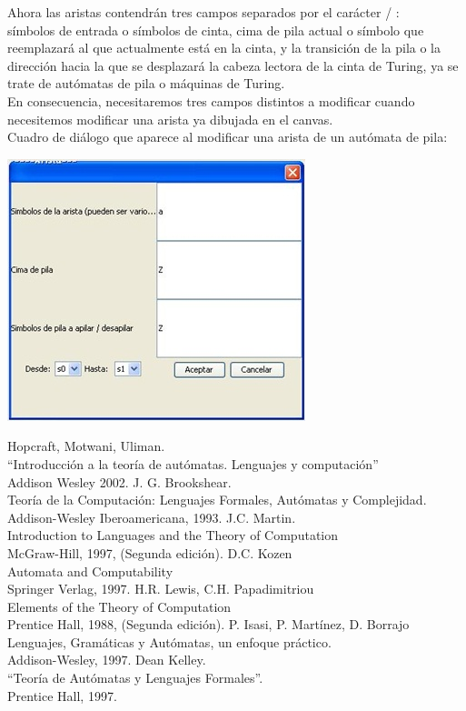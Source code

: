 \documentclass[12pt,a4paper,spanish]{book}
\begin{document}
\begin{itemize}
Ahora las aristas contendr\'an tres campos separados por el car\'acter / :\\
s\'imbolos de entrada o s\'imbolos de cinta, cima de pila actual o s\'imbolo que reemplazar\'a al que actualmente est\'a en la cinta, y la transici\'on de la pila o la direcci\'on hacia la que se desplazar\'a la cabeza lectora de la cinta de Turing, ya se trate de aut\'omatas de pila o m\'aquinas de Turing.\\ En consecuencia, necesitaremos tres campos distintos a modificar cuando necesitemos modificar una arista ya dibujada en el canvas.\\

Cuadro de di\'alogo que aparece al modificar una arista de un aut\'omata de pila:\\
\begin{center}
\includegraphics{roci6.jpg}
\end{center}
\end{itemize}

\begin{thebibliography}{XXX}
\bibitem{}Hopcraft, Motwani, Uliman.\\
``Introducci\'on a la teor\'ia de aut\'omatas. Lenguajes y computaci\'on''\\
Addison Wesley 2002.
\bibitem{}J. G. Brookshear.\\
Teor\'ia de la Computaci\'on: Lenguajes Formales, Aut\'omatas y Complejidad.\\
Addison-Wesley Iberoamericana, 1993.
\bibitem{}J.C. Martin.\\
Introduction to Languages and the Theory of Computation\\
McGraw-Hill, 1997, (Segunda edici\'on).
\bibitem{}D.C. Kozen\\
Automata and Computability\\
Springer Verlag, 1997.
\bibitem{}H.R. Lewis, C.H. Papadimitriou\\
Elements of the Theory of Computation\\
Prentice Hall, 1988, (Segunda edici\'on).
\bibitem{}P. Isasi, P. Mart\'inez, D. Borrajo\\
Lenguajes, Gram\'aticas y Aut\'omatas, un enfoque pr\'actico.\\
Addison-Wesley, 1997.
\bibitem{}Dean Kelley.\\
``Teor\'ia de Aut\'omatas y Lenguajes Formales''.\\
Prentice Hall, 1997.
\bibitem{}
\end{thebibliography}
\end{document}
